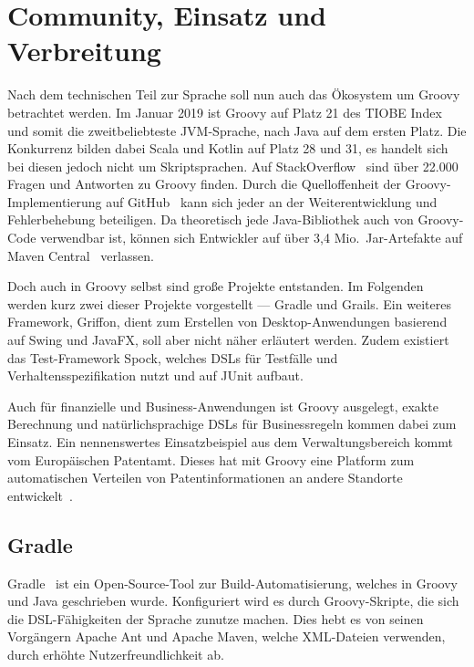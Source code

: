 \documentclass[a4paper]{article}
\begin{document}

\section{Community, Einsatz und Verbreitung}\label{sec:community}

Nach dem technischen Teil zur Sprache soll nun auch das Ökosystem um Groovy betrachtet werden.
Im Januar 2019 ist Groovy auf Platz 21 des TIOBE Index~\cite{tiobe-index} und somit die zweitbeliebteste JVM-Sprache, nach Java auf dem ersten Platz.
Die Konkurrenz bilden dabei Scala und Kotlin auf Platz 28 und 31, es handelt sich bei diesen jedoch nicht um Skriptsprachen.
Auf StackOverflow~\cite{stackoverflow:groovy} sind über 22.000 Fragen und Antworten zu Groovy finden.
Durch die Quelloffenheit der Groovy-Implementierung auf GitHub~\cite{github:groovy} kann sich jeder an der Weiterentwicklung und Fehlerbehebung beteiligen.
Da theoretisch jede Java-Bibliothek auch von Groovy-Code verwendbar ist, können sich Entwickler auf über 3,4 Mio.~Jar-Artefakte auf Maven Central~\cite{maven-central} verlassen.

Doch auch in Groovy selbst sind große Projekte entstanden.
Im Folgenden werden kurz zwei dieser Projekte vorgestellt --- Gradle und Grails.
Ein weiteres Framework, Griffon, dient zum Erstellen von Desktop-Anwendungen basierend auf Swing und JavaFX, soll aber nicht näher erläutert werden.
Zudem existiert das Test-Framework Spock, welches DSLs für Testfälle und Verhaltensspezifikation nutzt und auf JUnit aufbaut.

Auch für finanzielle und Business-Anwendungen ist Groovy ausgelegt, exakte Berechnung und natürlichsprachige DSLs für Businessregeln kommen dabei zum Einsatz.
Ein nennenswertes Einsatzbeispiel aus dem Verwaltungsbereich kommt vom Europäischen Patentamt.
Dieses hat mit Groovy eine Platform zum automatischen Verteilen von Patentinformationen an andere Standorte entwickelt~\cite{epo}.

\subsection{Gradle}\label{subsec:gradle}

Gradle~\cite{gradle} ist ein Open-Source-Tool zur Build-Automatisierung, welches in Groovy und Java geschrieben wurde.
Konfiguriert wird es durch Groovy-Skripte, die sich die DSL-Fähigkeiten der Sprache zunutze machen.
Dies hebt es von seinen Vorgängern Apache Ant und Apache Maven, welche XML-Dateien verwenden, durch erhöhte Nutzerfreundlichkeit ab.
\end{document}
